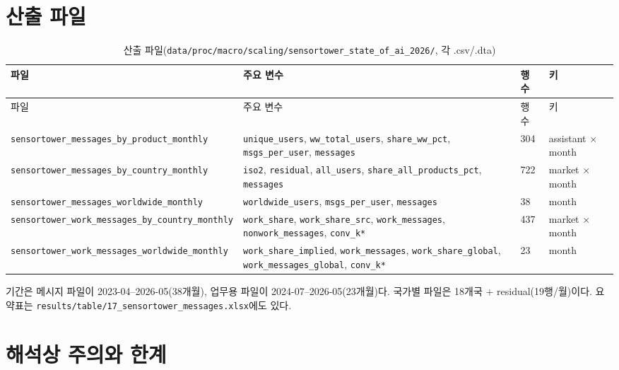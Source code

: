 \documentclass[11pt]{article}
\begin{document}
\section{산출 파일}

\begin{longtable}{L{5.4cm}L{6.2cm}R{1.2cm}L{2.6cm}}
\caption{산출 파일(\texttt{data/proc/macro/scaling/sensortower\_state\_of\_ai\_2026/}, 각 .csv/.dta)}\label{tab:files}\\
\toprule
파일 & 주요 변수 & 행 수 & 키 \\
\midrule
\endfirsthead
\toprule
파일 & 주요 변수 & 행 수 & 키 \\
\midrule
\endhead
\texttt{sensortower\_messages\_by\_product\_monthly} & \texttt{unique\_users}, \texttt{ww\_total\_users}, \texttt{share\_ww\_pct}, \texttt{msgs\_per\_user}, \texttt{messages} & 304 & assistant $\times$ month \\
\texttt{sensortower\_messages\_by\_country\_monthly} & \texttt{iso2}, \texttt{residual}, \texttt{all\_users}, \texttt{share\_all\_products\_pct}, \texttt{messages} & 722 & market $\times$ month \\
\texttt{sensortower\_messages\_worldwide\_monthly} & \texttt{worldwide\_users}, \texttt{msgs\_per\_user}, \texttt{messages} & 38 & month \\
\texttt{sensortower\_work\_messages\_by\_country\_monthly} & \texttt{work\_share}, \texttt{work\_share\_src}, \texttt{work\_messages}, \texttt{nonwork\_messages}, \texttt{conv\_k*} & 437 & market $\times$ month \\
\texttt{sensortower\_work\_messages\_worldwide\_monthly} & \texttt{work\_share\_implied}, \texttt{work\_messages}, \texttt{work\_share\_global}, \texttt{work\_messages\_global}, \texttt{conv\_k*} & 23 & month \\
\bottomrule
\end{longtable}

기간은 메시지 파일이 2023-04--2026-05(38개월), 업무용 파일이 2024-07--2026-05(23개월)다. 국가별 파일은 18개국 + residual(19행/월)이다. 요약표는 \texttt{results/table/17\_sensortower\_messages.xlsx}에도 있다.

\section{해석상 주의와 한계}
\end{document}
